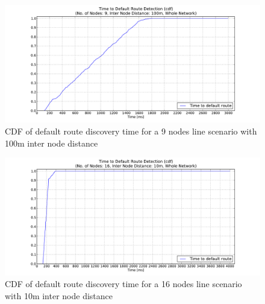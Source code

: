 \begin{figure}[htbp]
  \begin{center}
  \hspace{-20pt}
    \leavevmode
      \includegraphics[width=\textwidth]
      {Pics/results/9/MRHOF/line/dist100_montecarlo_cdf_hist.pdf}
   \caption{CDF of default route discovery time for a 9 nodes line scenario with 100m inter node distance}
   \label{fig:9_MRHOF_line100_cdf}
  \end{center}
  \vspace{-10pt}
\end{figure}


\begin{figure}[htbp]
  \begin{center}
  \hspace{-20pt}
    \leavevmode
      \includegraphics[width=\textwidth]
      {Pics/results/16/MRHOF/line/dist10_montecarlo_cdf_hist.pdf}
   \caption{CDF of default route discovery time for a 16 nodes line scenario with 10m inter node distance}
   \label{fig:16_MRHOF_line_10_cdf}
  \end{center}
  \vspace{-10pt}
\end{figure}

